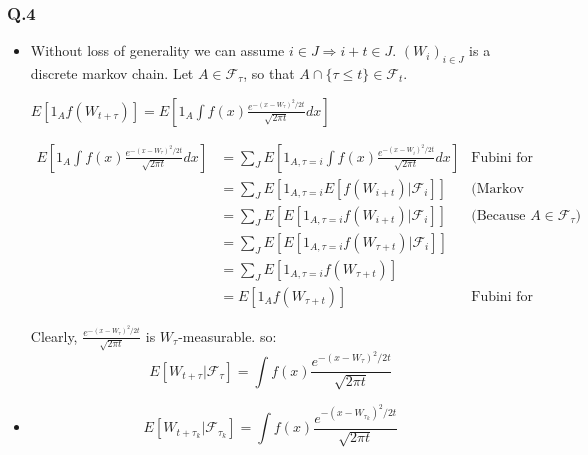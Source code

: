 \documentclass[12pt]{article}
\newcommand{\Q}[1]{\subsubsection*{Q.#1}}
\begin{document}
\Q{4}
\begin{itemize}
\item Without loss of generality we can assume
  $i \in J \Rightarrow i+t \in J$.  $(W_i)_{i \in J}$ is a discrete
  markov chain.  Let $A \in \mathcal F_{\tau}$, so that
  $A \cap \{\tau \le t\} \in \mathcal F_t$.

  $E[1_A f(W_{t + \tau})] = E[1_A \int f(x)
  \frac{e^{-(x-W_{\tau})^2/2t}}{\sqrt{2\pi t}} dx]$

\begin{align*}
  E[1_A \int f(x) \frac{e^{-(x-W_{\tau})^2/2t}}{\sqrt{2\pi t}} dx]
  &= \sum_J E[1_{A, \tau=i} \int f(x) \frac{e^{-(x-W_i)^2/2t}}{\sqrt{2\pi t}} dx] &\text{Fubini for bounded r.v}
  \\&= \sum_J E[1_{A, \tau=i} E[f(W_{i+t}) | \mathcal F_i]] &\text{(Markov Property)}
  \\&= \sum_J E[ E[ 1_{A, \tau=i}f(W_{i+t}) | \mathcal F_i]]&\text{(Because $A \in \mathcal F_{\tau}$)}
  \\&= \sum_J E[ E[ 1_{A, \tau=i} f(W_{\tau+t}) | \mathcal F_i]]
  \\&= \sum_J E[ 1_{A, \tau=i} f(W_{\tau+t})]
  \\&= E[ 1_A f(W_{\tau+t})] &\text{Fubini for bounded r.v}
\end{align*}

Clearly, $\frac{e^{-(x-W_{\tau})^2/2t}}{\sqrt{2\pi t}}$ is
$W_{\tau}$-measurable. so:
$$E[W_{t+\tau} | \mathcal F_{\tau}] = \int f(x) \frac{e^{-(x-W_{\tau})^2/2t}}{\sqrt{2\pi t}}$$

\item

  $$E[W_{t+\tau_k} | \mathcal F_{\tau_k}] = \int f(x) \frac{e^{-(x-W_{\tau_k})^2/2t}}{\sqrt{2\pi t}}$$
\end{itemize}
\end{document}
